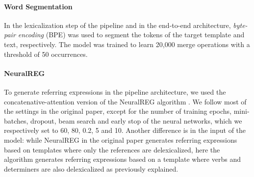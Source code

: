 \documentclass[11pt,a4paper]{article}
\begin{document}
\paragraph{Word Segmentation} In the lexicalization step of the pipeline and in the end-to-end architecture, \textit{byte-pair encoding} (BPE) \cite{sennrich2016b} was used to segment the tokens of the target template and text, respectively. The model was trained to learn 20,000 merge operations with a threshold of 50 occurrences.

\paragraph{NeuralREG} To generate referring expressions in the pipeline architecture, we used the concatenative-attention version of the NeuralREG algorithm \cite{ferreira2018}. We follow most of the settings in the original paper, except for the number of training epochs, mini-batches, dropout, beam search and early stop of the neural networks, which we respectively set to 60, 80, 0.2, 5 and 10. Another difference is in the input of the model: while NeuralREG in the original paper generates referring expressions based on templates where only the references are delexicalized, here the algorithm generates referring expressions based on a template where verbs and determiners are also delexicalized as previously explained.
\end{document}
